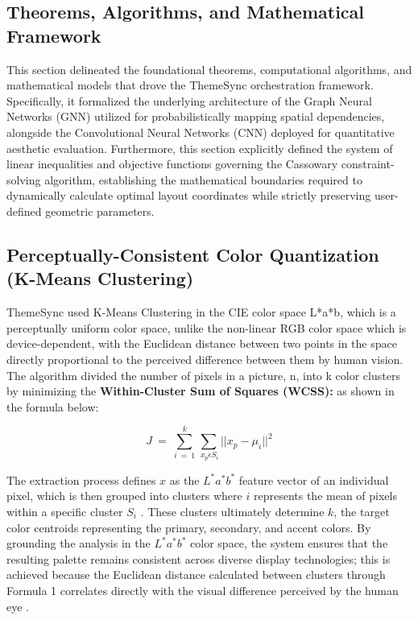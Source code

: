 \begin{refsection}
\section{Theorems, Algorithms, and Mathematical Framework}
This section delineated the foundational theorems, computational algorithms, and mathematical models that drove the ThemeSync orchestration framework. Specifically, it formalized the underlying architecture of the Graph Neural Networks (GNN) utilized for probabilistically mapping spatial dependencies, alongside the Convolutional Neural Networks (CNN) deployed for quantitative aesthetic evaluation. Furthermore, this section explicitly defined the system of linear inequalities and objective functions governing the Cassowary constraint-solving algorithm, establishing the mathematical boundaries required to dynamically calculate optimal layout coordinates while strictly preserving user-defined geometric parameters.

\subsection{Perceptually-Consistent Color Quantization (K-Means Clustering)}
ThemeSync used K-Means Clustering in the CIE color space L*a*b, which is a perceptually uniform color space, unlike the non-linear RGB color space which is device-dependent, with the Euclidean distance between two points in the space directly proportional to the perceived difference between them by human vision.
The algorithm divided the number of pixels in a picture, n, into k color clusters by minimizing the \textbf{Within-Cluster Sum of Squares (WCSS):} as shown in the formula below:

\begin{center}
\begin{minipage}{0.8\textwidth}
\begin{equation}
J\ =\ \sum_{i\ =\ 1}^{k}\sum_{{\ x}_p\epsilon S_i}||x_p-\mu_i{||}^2
\end{equation}
\centering
\end{minipage}
\end{center}

The extraction process defines $x$ as the $L^*a^*b^*$ feature vector of an individual pixel, which is then grouped into clusters where $i$ represents the mean of pixels within a specific cluster $S_i$ \cite{Lertrusdachakul2025Hybrid}. These clusters ultimately determine $k$, the target color centroids representing the primary, secondary, and accent colors. By grounding the analysis in the $L^*a^*b^*$ color space, the system ensures that the resulting palette remains consistent across diverse display technologies; this is achieved because the Euclidean distance calculated between clusters through Formula 1 correlates directly with the visual difference perceived by the human eye \cite{Garcia2023}.


\end{refsection}
